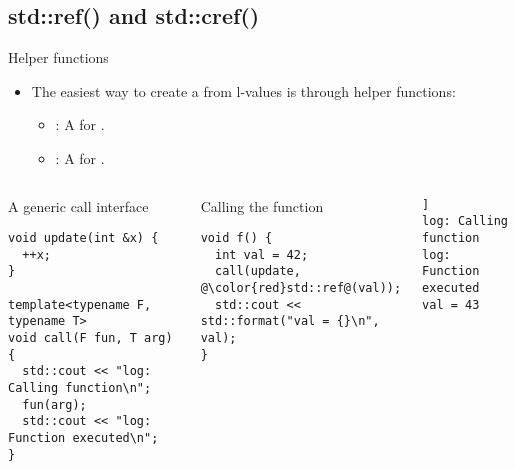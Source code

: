 \subsection{std::ref() and std::cref()}

\begin{frame}[t,fragile]{Helper functions}
\begin{itemize}
  \item The easiest way to create a  from l-values 
        is through helper functions:
    \begin{itemize}
      \item {}: A  for .
      \item {}: A  for .
    \end{itemize}
\end{itemize}

\begin{columns}[T]

\begin{block}{A generic call interface}
\begin{lstlisting}[basicstyle=\tiny]
void update(int &x) {
  ++x;
}

template<typename F, typename T>
void call(F fun, T arg) {
  std::cout << "log: Calling function\n";
  fun(arg);
  std::cout << "log: Function executed\n";
}
\end{lstlisting}
\end{block}

\pause
{}
\begin{block}{Calling the function}
\begin{lstlisting}[basicstyle=\tiny,escapechar=@]
void f() {
  int val = 42;
  call(update, @\color{red}std::ref@(val));
  std::cout << std::format("val = {}\n", val);
}
\end{lstlisting}
\end{block}

\pause
\begin{lstlisting}[style=terminal,basicstyle=\tiny]]
log: Calling function
log: Function executed
val = 43
\end{lstlisting}

\end{columns}
\end{frame}


